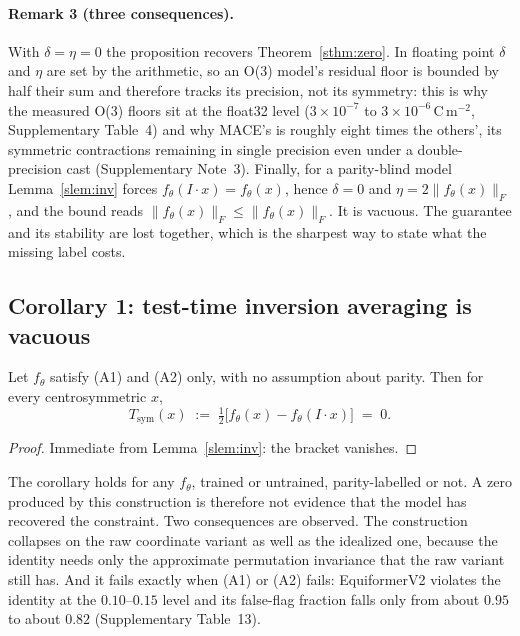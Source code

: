 \paragraph{Remark 3 (three consequences).} With $\delta=\eta=0$ the proposition recovers Theorem~\ref{sthm:zero}. In floating point $\delta$ and $\eta$ are set by the arithmetic, so an O(3) model's residual floor is bounded by half their sum and therefore tracks its precision, not its symmetry: this is why the measured O(3) floors sit at the float32 level ($3\times10^{-7}$ to $3\times10^{-6}$\,C\,m$^{-2}$, Supplementary Table~4) and why MACE's is roughly eight times the others', its symmetric contractions remaining in single precision even under a double-precision cast (Supplementary Note~3). Finally, for a parity-blind model Lemma~\ref{slem:inv} forces $f_\theta(I\!\cdot\!x)=f_\theta(x)$, hence $\delta=0$ and $\eta = 2\lVert f_\theta(x)\rVert_F$, and the bound reads $\lVert f_\theta(x)\rVert_F \le \lVert f_\theta(x)\rVert_F$. It is vacuous. The guarantee and its stability are lost together, which is the sharpest way to state what the missing label costs.

\subsection*{Corollary 1: test-time inversion averaging is vacuous}

\begin{corollary}\label{scor:sym}
Let $f_\theta$ satisfy (A1) and (A2) only, with no assumption about parity. Then for every centrosymmetric $x$,
\[
T_{\mathrm{sym}}(x) \;:=\; \tfrac{1}{2}\bigl[f_\theta(x) - f_\theta(I\!\cdot\!x)\bigr] \;=\; 0 .
\]
\end{corollary}

\begin{proof}
Immediate from Lemma~\ref{slem:inv}: the bracket vanishes.
\end{proof}

The corollary holds for any $f_\theta$, trained or untrained, parity-labelled or not. A zero produced by this construction is therefore not evidence that the model has recovered the constraint. Two consequences are observed. The construction collapses on the raw coordinate variant as well as the idealized one, because the identity needs only the approximate permutation invariance that the raw variant still has. And it fails exactly when (A1) or (A2) fails: EquiformerV2 violates the identity at the $0.10$--$0.15$ level and its false-flag fraction falls only from about $0.95$ to about $0.82$ (Supplementary Table~13).

